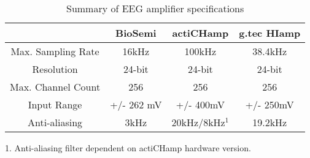 \begin{table}[]
\centering
\caption{Summary of EEG amplifier specifications} 
\label{tableeeg}
\begin{tabular}{|c|c|c|c|}
\hline
\textbf{}          & \textbf{BioSemi} & \textbf{actiCHamp} & \textbf{g.tec HIamp} \\ \hline
Max. Sampling Rate & 16kHz            & 100kHz             & 38.4kHz              \\ \hline
Resolution         & 24-bit           & 24-bit             & 24-bit               \\ \hline
Max. Channel Count      & 256              & 256                & 256                  \\ \hline
Input Range      & +/- 262 mV            & +/- 400mV          & +/- 250mV            \\ \hline
Anti-aliasing      & 3kHz             & 20kHz/8kHz$^{1}$         &  19.2kHz      \\ \hline
\end{tabular}
\end{table}

1. Anti-aliasing filter dependent on actiCHamp hardware version.
